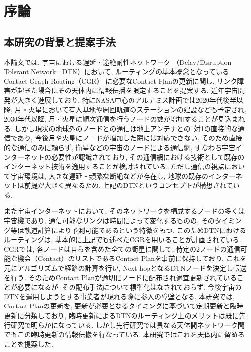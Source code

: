 \chapter{序論}

\section{本研究の背景と提案手法}
本論文では, 宇宙における遅延・途絶耐性ネットワーク
（Delay/Disruption Tolerant Network : DTN）\cite{rfc9171}において, 
ルーティングの基本概念となっているContact Graph Routing（CGR）
\cite{burleigh-dtnrg-cgr-01}に必要なContact Planの更新に関し, 
リンク障害が起きた場合にその天体内に情報伝播を限定することを提案する. 
近年宇宙開発が大きく進展しており, 特にNASA中心のアルテミス計画\cite{nasa2020}では2020年代後半以降, 
月・火星において有人基地や周回軌道のステーションの建設なども予定され, 
2030年代以降, 月・火星に順次通信を行うノードの数が増加することが見込まれる. 
しかし現状の地球外のノードとの通信は地上アンテナとの1対1の直接的な通信であり, 
今後月や火星にノードが増加した際には対応できない. そのため直接的な通信のみに頼らず, 
衛星などの宇宙のノードによる通信網, すなわち宇宙インターネットの必要性が認識されており, 
その通信網における技術として既存のインターネット技術を適用することが検討されている. 
ただし通信の視点において宇宙環境は, 大きな遅延・頻繁な断絶などが存在し, 
地球の既存のインターネットは前提が大きく異なるため, 
上記のDTNというコンセプトが構想されている. 

また宇宙インターネットにおいて, そのネットワークを構成するノードの多くは宇宙機であり, 
通信可能なリンクは時間によって変化するものの, そのタイミング等は軌道計算により予測可能であるという特徴をもつ. 
このためDTNにおけるルーティングは, 基本的に上記でも述べたCGRを用いることが計画されている. 
CGRでは, 各ノードは自らを含めた全ての衛星に関して, 
特定の2ノードの通信可能な機会（Contact）のリストであるContact Planを事前に保持しており, 
これを元にアルゴリズムで経路の計算を行い, Next hopとなるDTNノードを決定し転送を行う. 
そのためContact Planが適切にノードに配布され適宜更新されていることが必要になるが, 
その配布手法について標準化はなされておらず, 今後宇宙のDTNを運用しようとする事業者が現れる際に参入の障壁となる. 
本研究では, Contact Planの更新を, 
更新が必要となるタイミングに基づいて定期更新と臨時更新に分類しており, 
臨時更新によるDTNのルーティング上のメリットは既に先行研究で明らかになっている\cite{Bezirgiannidis2013}. 
しかし先行研究では異なる天体間ネットワーク間でもこの臨時更新の情報伝搬を行なっている. 
本研究ではこれを天体内に留めることを提案した. 

